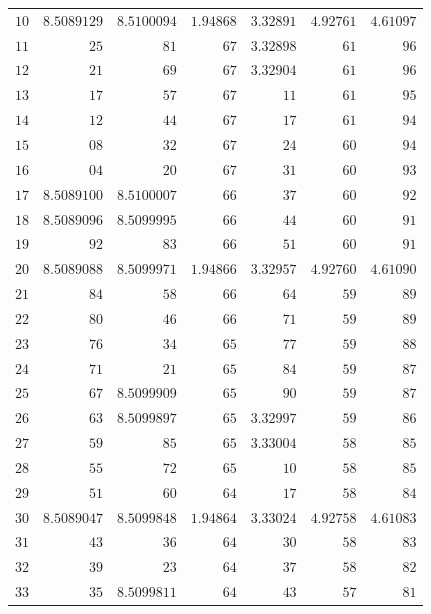 \begin{center}
\begin{tabular}{||r||r|r|r|r|r|r||}
\(10\) & \(8.5089129\) & \(8.5100094\) & \(1.94868\) & \(3.32891\) & \(4.92761\) & \(4.61097\)\\
\(11\) & \(25\) & \(81\) & \(67\) & \(3.32898\) & \(61\) & \(96\)\\
\(12\) & \(21\) & \(69\) & \(67\) & \(3.32904\) & \(61\) & \(96\)\\
\(13\) & \(17\) & \(57\) & \(67\) & \(11\) & \(61\) & \(95\)\\
\(14\) & \(12\) & \(44\) & \(67\) & \(17\) & \(61\) & \(94\)\\
\(15\) & \(08\) & \(32\) & \(67\) & \(24\) & \(60\) & \(94\)\\
\(16\) & \(04\) & \(20\) & \(67\) & \(31\) & \(60\) & \(93\)\\
\(17\) & \(8.5089100\) & \(8.5100007\) & \(66\) & \(37\) & \(60\) & \(92\)\\
\(18\) & \(8.5089096\) & \(8.5099995\) & \(66\) & \(44\) & \(60\) & \(91\)\\
\(19\) & \(92\) & \(83\) & \(66\) & \(51\) & \(60\) & \(91\)\\[3pt]
\(20\) & \(8.5089088\) & \(8.5099971\) & \(1.94866\) & \(3.32957\) & \(4.92760\) & \(4.61090\)\\
\(21\) & \(84\) & \(58\) & \(66\) & \(64\) & \(59\) & \(89\)\\
\(22\) & \(80\) & \(46\) & \(66\) & \(71\) & \(59\) & \(89\)\\
\(23\) & \(76\) & \(34\) & \(65\) & \(77\) & \(59\) & \(88\)\\
\(24\) & \(71\) & \(21\) & \(65\) & \(84\) & \(59\) & \(87\)\\
\(25\) & \(67\) & \(8.5099909\) & \(65\) & \(90\) & \(59\) & \(87\)\\
\(26\) & \(63\) & \(8.5099897\) & \(65\) & \(3.32997\) & \(59\) & \(86\)\\
\(27\) & \(59\) & \(85\) & \(65\) & \(3.33004\) & \(58\) & \(85\)\\
\(28\) & \(55\) & \(72\) & \(65\) & \(10\) & \(58\) & \(85\)\\
\(29\) & \(51\) & \(60\) & \(64\) & \(17\) & \(58\) & \(84\)\\[3pt]
\(30\) & \(8.5089047\) & \(8.5099848\) & \(1.94864\) & \(3.33024\) & \(4.92758\) & \(4.61083\)\\
\(31\) & \(43\) & \(36\) & \(64\) & \(30\) & \(58\) & \(83\)\\
\(32\) & \(39\) & \(23\) & \(64\) & \(37\) & \(58\) & \(82\)\\
\(33\) & \(35\) & \(8.5099811\) & \(64\) & \(43\) & \(57\) & \(81\)\\

\end{tabular}
\end{center}
